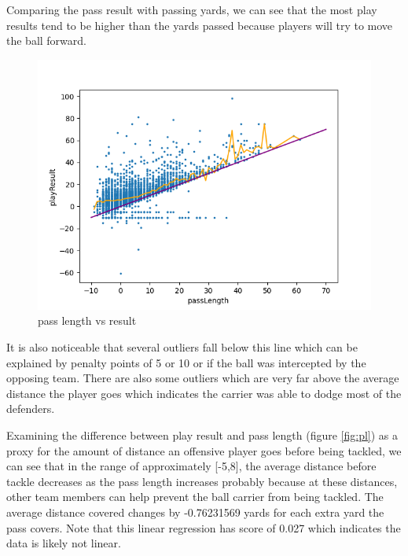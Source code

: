 \documentclass[bibtex, sigconf, hyperref={colorlinks=true,linkcolor=blue,urlcolor=blue}]{acmart}
\begin{document}
Comparing the pass result with passing yards, we can see that the most play results
tend to be higher than the yards passed because players will try to move the
ball forward.
\begin{figure}[h]
  \centering
  \includegraphics[width=\linewidth]{length_v_result}
  \caption{pass length vs result}
\end{figure}
It is also noticeable that several outliers fall below this line which can be
explained by penalty points of 5 or 10 or if the ball was intercepted by the
opposing team. There are also some outliers which are very far above the average
distance the player goes which indicates the carrier was able to dodge most of
the defenders.

Examining the difference between play result and pass length (figure
\ref{fig:pl}) as a proxy for the amount of distance an offensive player goes
before being tackled, we can see that in the range of approximately [-5,8], the
average distance before tackle decreases as the pass length increases probably
because at these distances, other team members can help prevent the ball carrier
from being tackled. The average distance covered changes by -0.76231569 yards
for each extra yard the pass covers. Note that this linear regression has score
of 0.027 which indicates the data is likely not linear.
\end{document}
